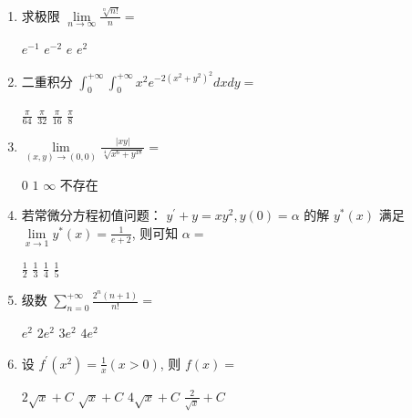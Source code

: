 \begin{enumerate}
\begin{enumerate}
\fourchoices
{$\frac{1}{9}$}
{$\frac{2}{9}$}
{$\frac{1}{3}$}
{$\frac{4}{9}$}

\item 
求极限 $\lim\limits _{n \rightarrow \infty} \frac{\sqrt[n]{n !}}{n}=$  


\fourchoices
{$e^{-1}$}
{$e^{-2}$}
{$e$}
{$e^{2}$}

\item 
二重积分 $\int_{0}^{+\infty} \int_{0}^{+\infty} x^{2} e^{-2\left(x^{2}+y^{2}\right)^{2}} d x d y=$  


\fourchoices
{$\frac{\pi}{64}$}
{$\frac{\pi}{32}$}
{$\frac{\pi}{16}$}
{$\frac{\pi}{8}$}

\item 
$ \lim\limits _{(x, y) \rightarrow(0,0)} \frac{|x y|}{\sqrt[4]{x^{6}+y^{18} }}= $  


\fourchoices
{$ 0 $}
{$ 1 $}
{$ \infty$}
{不存在}

\item 
若常微分方程初值问题： $y^{\prime}+y=x y^{2}, y(0)=\alpha$ 的解 $y^{*}(x)$ 满足 $\lim\limits _{x \rightarrow 1} y^{*}(x)=\frac{1}{e+2}$, 则可知 $\alpha=$  


\fourchoices
{$\frac{1}{2}$}
{$\frac{1}{3}$}
{$\frac{1}{4}$}
{$\frac{1}{5}$}


\item 
级数 $\sum\limits_{n=0}^{+\infty} \frac{2^{n}(n+1)}{n !}=$  


\fourchoices
{$e^{2}$}
{$2 e^{2}$}
{$3 e^{2}$}
{$4 e^{2}$}

\item 
设 $f^{\prime}\left(x^{2}\right)=\frac{1}{x}(x>0)$, 则 $f(x)=$  


\fourchoices
{$2 \sqrt{x}+C$}
{$\sqrt{x}+C$}
{$4 \sqrt{x}+C$}
{$\frac{2}{\sqrt{x}}+C$}

	
	
\end{enumerate}

\end{enumerate}
